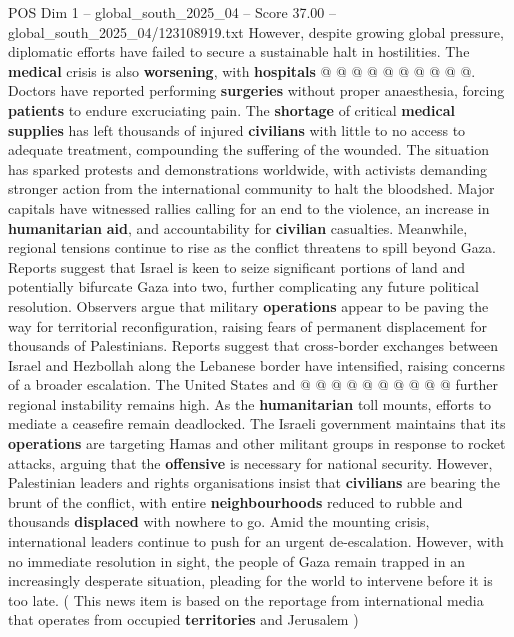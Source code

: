 \begin{textsample}{POS Dim 1 – global\_south\_2025\_04 – Score 37.00 – global\_south\_2025\_04/123108919.txt}
However, despite growing global pressure, diplomatic efforts have failed to secure a sustainable halt in hostilities.
The \textbf{medical} crisis is also \textbf{worsening}, with \textbf{hospitals} @ @ @ @ @ @ @ @ @ @.
Doctors have reported performing \textbf{surgeries} without proper anaesthesia, forcing \textbf{patients} to endure excruciating pain.
The \textbf{shortage} of critical \textbf{medical} \textbf{supplies} has left thousands of injured \textbf{civilians} with little to no access to adequate treatment, compounding the suffering of the wounded.
The situation has sparked protests and demonstrations worldwide, with activists demanding stronger action from the international community to halt the bloodshed.
Major capitals have witnessed rallies calling for an end to the violence, an increase in \textbf{humanitarian} \textbf{aid}, and accountability for \textbf{civilian} casualties.
Meanwhile, regional tensions continue to rise as the conflict threatens to spill beyond Gaza.
Reports suggest that Israel is keen to seize significant portions of land and potentially bifurcate Gaza into two, further complicating any future political resolution.
Observers argue that military \textbf{operations} appear to be paving the way for territorial reconfiguration, raising fears of permanent displacement for thousands of Palestinians.
Reports suggest that cross-border exchanges between Israel and Hezbollah along the Lebanese border have intensified, raising concerns of a broader escalation.
The United States and @ @ @ @ @ @ @ @ @ @ further regional instability remains high.
As the \textbf{humanitarian} toll mounts, efforts to mediate a ceasefire remain deadlocked.
The Israeli government maintains that its \textbf{operations} are targeting Hamas and other militant groups in response to rocket attacks, arguing that the \textbf{offensive} is necessary for national security.
However, Palestinian leaders and rights organisations insist that \textbf{civilians} are bearing the brunt of the conflict, with entire \textbf{neighbourhoods} reduced to rubble and thousands \textbf{displaced} with nowhere to go.
Amid the mounting crisis, international leaders continue to push for an urgent de-escalation.
However, with no immediate resolution in sight, the people of Gaza remain trapped in an increasingly desperate situation, pleading for the world to intervene before it is too late. ( This news item is based on the reportage from international media that operates from occupied \textbf{territories} and Jerusalem )

\end{textsample}
